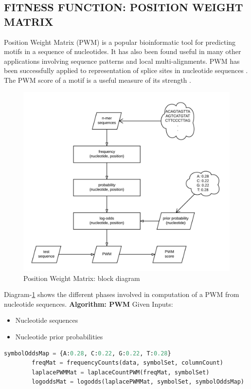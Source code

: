\documentclass[12pt,a4paper]{article}
\begin{document}
	\subsection{FITNESS FUNCTION: POSITION WEIGHT MATRIX}
	Position Weight Matrix (PWM) is a popular bioinformatic tool for predicting motifs in a sequence of nucleotides. It has also been found useful in many other applications involving sequence patterns and local multi-alignments. PWM has been successfully applied to representation of splice sites in nucleotide sequences \cite{pwm-2}. The PWM score of a motif is a useful measure of its strength \cite{pwm-1}. \par
	
	\begin{figure}[H]
		\label{fig:pwm}
		\includegraphics[width=\textwidth]{"pwm"}
		\caption{Position Weight Matrix: block diagram}
		\centering
	\end{figure}
	
	Diagram-\ref{fig:pwm} shows the different phases involved in computation of a PWM from nucleotide sequences.
	\textbf{Algorithm: PWM}
	Given Inputs:
	\begin{itemize}
	\item Nucleotide sequences
	\item Nucleotide prior probabilities
	\end{itemize}
	
	\begin{lstlisting}[language=Python]
        symbolOddsMap = {A:0.28, C:0.22, G:0.22, T:0.28}
        freqMat = frequencyCounts(data, symbolSet, columnCount)
        laplacePWMMat = laplaceCountPWM(freqMat, symbolSet)
        logoddsMat = logodds(laplacePWMMat, symbolSet, symbolOddsMap)	
	\end{lstlisting}
	
\end{document}
